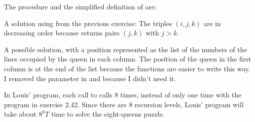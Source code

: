 \begin{exe}[2.40]
    The procedure  and the simplified definition of 
     are:
\end{exe}

\begin{exe}[2.41]
    A solution using  from the previous exercise:
    The triples $(i, j, k)$ are in decreasing order because  
    returns pairs $(j, k)$ with $j > k$.
\end{exe}

\begin{exe}[2.42]
    A possible solution, with a position represented as the list of the numbers 
    of the lines occupied by the queen in each column. The position of the queen 
    in the first column is at the end of the list because the functions are 
    easier to write this way. I removed the  parameter in  
    and  because I didn’t need it.
\end{exe}

\begin{exe}[2.43]
    In Louis’ program, each call to  calls 
     8 times, instead of only one time with the 
    program in exercise 2.42. Since there are 8 recursion levels, Louis’ program 
    will take about $8^8T$ time to solve the eight-queens puzzle.
\end{exe}
